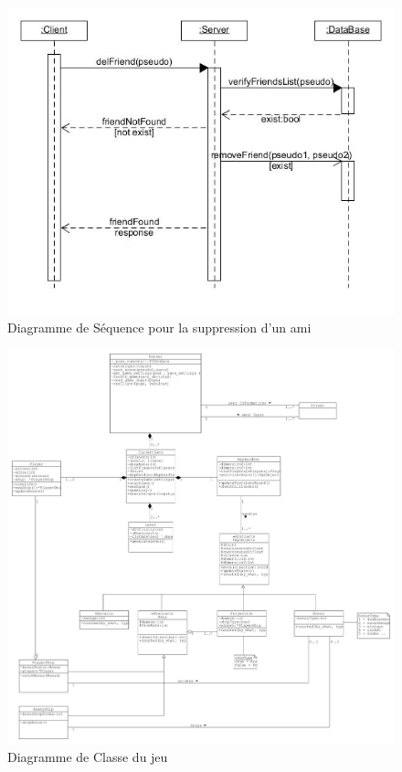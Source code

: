 \documentclass[a4paper,12pt]{article}
\begin{document}
\begin{figure}[hbtp]
\centering
\includegraphics[scale=0.5]{images/del_friend.jpg}
\caption{Diagramme de Séquence pour la suppression d'un ami }
\end{figure}


\begin{figure}[hbtp]
\centering
\includegraphics[scale=0.3]{images/newGameClassDiagram.jpg}
\caption{Diagramme de Classe du jeu}
\end{figure}
\end{document}
